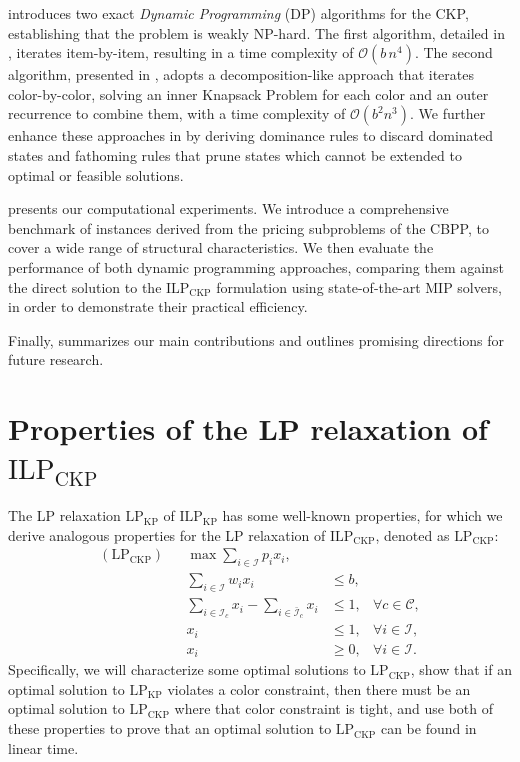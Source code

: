 \documentclass[preprint,11pt]{elsarticle}
\newcommand{\items}{\mathcal{I}}
\newcommand{\colors}{\mathcal{C}}
\newcommand{\profit}{p}
\newcommand{\weight}{w}
\newcommand{\capacity}{b}
\newcommand{\formKP}{\text{ILP}_\text{KP}}
\newcommand{\formCKP}{\text{ILP}_\text{CKP}}
\newcommand{\ckpLP}{\text{LP}_\text{CKP}}
\newcommand{\kpLP}{\text{LP}_\text{KP}}
\theoremstyle{definition}
\begin{document}
\smallskip

 introduces two exact \textit{Dynamic Programming} (DP) algorithms for the CKP, establishing that the problem is weakly NP-hard. The first algorithm, detailed in , iterates item-by-item, resulting in a time complexity of $\mathcal{O}(b \, n^4)$. The second algorithm, presented in , adopts a decomposition-like approach that iterates color-by-color, solving an inner Knapsack Problem for each color and an outer recurrence to combine them, with a time complexity of $\mathcal{O}(b^2n^3)$. We further enhance these approaches in  by deriving dominance rules to discard dominated states and fathoming rules that prune states which cannot be extended to optimal or feasible solutions.

\smallskip

 presents our computational experiments. We introduce a comprehensive benchmark of instances derived from the pricing subproblems of the CBPP, to cover a wide range of structural characteristics. We then evaluate the performance of both dynamic programming approaches, comparing them against the direct solution to the $\formCKP$ formulation using state-of-the-art MIP solvers, in order to demonstrate their practical efficiency.

\smallskip

Finally,  summarizes our main contributions and outlines promising directions for future research.


\section{Properties of the LP relaxation of $\formCKP$}\label{sec:ILP}
The LP relaxation $\kpLP$ of $\formKP$ has some well-known properties, for which we derive analogous properties for the LP relaxation of $\formCKP$, denoted as $\ckpLP$:
\begin{subequations}
\begin{align}
   (\ckpLP)  &  &\max  \sum_{i \in \items} \profit_i x_i, \\
     &    & \sum_{i \in \items} \weight_i x_i        & \leq \capacity, \label{eq:LPcapacity}\\
     && \sum_{i \in \items_c} x_i - \sum_{i \in \bar{\items}_c} x_i & \leq  1, & \forall c \in \colors,  \label{eq:LPcolorbalance}\\
     && x_i & \leq  1, & \forall i \in \items,  \label{eq:LPbound} \\
     && x_i & \geq   0, & \forall i \in \items.
\end{align}
\end{subequations}
Specifically, we will characterize some optimal solutions to $\ckpLP$, show that if an optimal solution to $\kpLP$ violates a color constraint, then there must be an optimal solution to $\ckpLP$ where that color constraint is tight, and use both of these properties to prove that an optimal solution to $\ckpLP$ can be found in linear time. 
\end{document}
